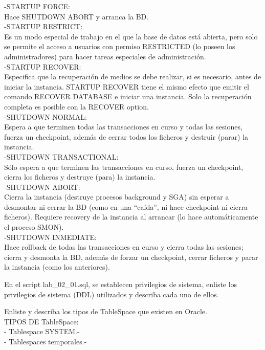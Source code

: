     -STARTUP FORCE:\\
    Hace SHUTDOWN ABORT y arranca la BD.\\
    
    -STARTUP RESTRICT:\\
    Es un modo especial de trabajo en el que la base de datos está abierta, pero solo se permite el acceso a usuarios 
    con permiso RESTRICTED (lo poseen los administradores) para hacer tareas especiales de administración.\\
    
    -STARTUP RECOVER:\\
    Especifica que la recuperación de medios se debe realizar, si es necesario, antes de iniciar la instancia. STARTUP RECOVER tiene el mismo efecto que emitir el comando RECOVER DATABASE e iniciar una instancia. Solo la recuperación completa es posible con la RECOVER option.\\
    
    -SHUTDOWN NORMAL:\\
    Espera a que terminen todas las transacciones en curso y todas las sesiones, 
    fuerza un checkpoint, además de cerrar todos los ficheros y destruir (parar) la instancia.\\
    
    -SHUTDOWN TRANSACTIONAL:\\
    Sólo espera a que terminen las transacciones en curso, fuerza un checkpoint, cierra los ficheros y destruye (para) la instancia.\\
    
    -SHUTDOWN ABORT:\\
     Cierra la instancia (destruye procesos background y SGA) sin esperar a desmontar ni cerrar la BD (como en una “caída”, ni hace checkpoint ni cierra ficheros). Requiere recovery de la instancia al arrancar (lo hace automáticamente el proceso SMON).\\

    -SHUTDOWN INMEDIATE:\\
    Hace rollback de todas las transacciones en curso y cierra todas las sesiones; cierra y desmonta la BD, además de forzar un checkpoint, cerrar ficheros y parar la instancia (como los anteriores).\\
    
   \item En el script lab_02_01.sql, se establecen privilegios de sistema, enliste los privilegios de sistema (DDL) 
   utilizados y describa cada uno de ellos.\\
   
   \item Enliste y describa los tipos de TableSpace que existen en Oracle.\\
   TIPOS DE TableSpace:\\
   - Tablespace SYSTEM.-\\
   - Tablespaces temporales.-\\
